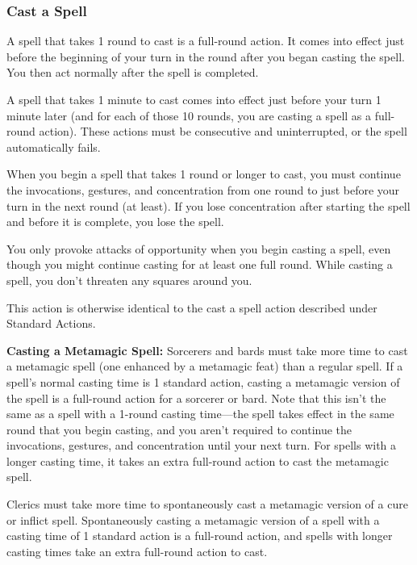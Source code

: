 \subsubsection{Cast a Spell}
A spell that takes 1 round to cast is a full-round action. It comes into effect just before the beginning of your turn in the round after you began casting the spell. You then act normally after the spell is completed.

A spell that takes 1 minute to cast comes into effect just before your turn 1 minute later (and for each of those 10 rounds, you are casting a spell as a full-round action). These actions must be consecutive and uninterrupted, or the spell automatically fails.

When you begin a spell that takes 1 round or longer to cast, you must continue the invocations, gestures, and concentration from one round to just before your turn in the next round (at least). If you lose concentration after starting the spell and before it is complete, you lose the spell.

You only provoke attacks of opportunity when you begin casting a spell, even though you might continue casting for at least one full round. While casting a spell, you don't threaten any squares around you.

This action is otherwise identical to the cast a spell action described under Standard Actions.

\textbf{Casting a Metamagic Spell:} Sorcerers and bards must take more time to cast a metamagic spell (one enhanced by a metamagic feat) than a regular spell. If a spell's normal casting time is 1 standard action, casting a metamagic version of the spell is a full-round action for a sorcerer or bard. Note that this isn't the same as a spell with a 1-round casting time—the spell takes effect in the same round that you begin casting, and you aren't required to continue the invocations, gestures, and concentration until your next turn. For spells with a longer casting time, it takes an extra full-round action to cast the metamagic spell.

Clerics must take more time to spontaneously cast a metamagic version of a cure or inflict spell. Spontaneously casting a metamagic version of a spell with a casting time of 1 standard action is a full-round action, and spells with longer casting times take an extra full-round action to cast.